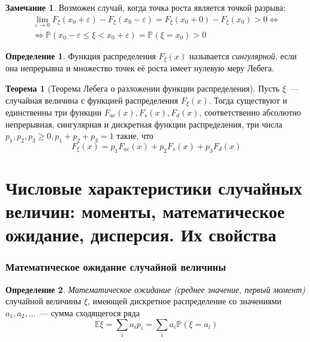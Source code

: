 \documentclass[oneside,final,14pt]{extreport}
\theoremstyle{plain}
\theoremstyle{definition}
\newtheorem*{defn}{Определение}
\newtheorem*{rmrk}{Замечание}
\theoremstyle{named}
\newtheorem*{namedthm}{Теорема}
\begin{document}
\begin{rmrk}
    Возможен случай, когда точка роста является точкой разрыва:
    \begin{multline*}
    \lim _{\varepsilon \to 0} F_{\xi}\left(x_{0}+\varepsilon\right)-F_{\xi}\left(x_{0}-\varepsilon\right)=F_{\xi}\left(x_{0}+0\right)-F_{\xi}\left(x_{0}\right)>0 \Leftrightarrow \\
    \Leftrightarrow \mathbb{P}\left(x_{0}-\varepsilon \leqslant \xi<x_{0}+\varepsilon\right)=\mathbb{P}\left(\xi=x_{0}\right)>0
    \end{multline*}
\end{rmrk}

\begin{defn}
    Функция распределения $F_\xi(x)$ называется {\it сингулярной}, если она непрерывна и множество точек её роста имеет нулевую меру Лебега.
\end{defn}

\begin{namedthm}[Теорема Лебега о разложении функции распределения]
    Пусть $\xi$~--- случайная величина с функцией распределения $F_\xi(x).$ Тогда существуют и единственны три функции $F_{ac}(x), F_s(x), F_d(x)$, соответственно абсолютно непрерывная, сингулярная и дискретная функции распределения, три числа $p_1, p_2, p_3 \geq 0, p_1 + p_2 + p_3 = 1$ такие, что 
    \begin{equation*}
        F_{\xi}(x)=p_{1} F_{ac}(x)+p_{2} F_{s}(x)+p_{3} F_{d}(x)
    \end{equation*}
\end{namedthm}

\section{Числовые характеристики случайных величин: моменты, математическое ожидание, дисперсия. Их свойства}

\subsubsection{Математическое ожидание случайной величины}
\begin{defn}
    {\it Математическое ожидание (среднее значение, первый момент)} случайной величины $\xi$, имеющей дискретное распределение со значениями $a_1, a_2, \ldots$~--- сумма сходящегося ряда
    \begin{equation*}
        \mathbb{E} \xi=\sum\limits_{i} a_{i} p_{i}=\sum\limits_{i} a_{i} \mathbb{P}\left(\xi=a_{i}\right)
    \end{equation*}
\end{defn}
\end{document}
